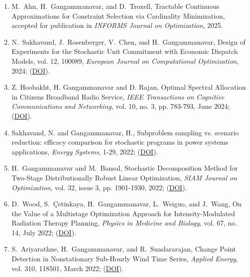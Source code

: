 \documentclass[hyperref, margin]{myResume}
\begin{document}
\begin{resume}
\begin{enumerate}[label=J\arabic*., leftmargin=*]

	\item M.\ Ahn, H.\ Gangammanavar, and D.\ Troxell\footnotemark[2], Tractable Continuous Approximations for Constraint Selection via Cardinality Minimization, accepted for publication in \textit{INFORMS Journal on Optimization}, 2025.

	\item N.\ Sakhavand\footnotemark[3], J.\ Rosenberger, V.\ Chen, and H.\ Gangammanavar, Design of Experiments for the Stochastic Unit Commitment with Economic Dispatch Models, vol. 12, 100089, \textit{European Journal on Computational Optimization}, 2024; (\href{https://doi.org/10.1016/j.ejco.2024.100089}{DOI}). 

	\item Z. Hoobakht\footnotemark[3], H. Gangammanavar and D. Rajan, Optimal Spectral Allocation in Citizens Broadband Radio Service,  \textit{IEEE Transactions on Cognitive Communications and Networking}, vol. 10, no. 3, pp. 783-793, June 2024; (\href{https://doi.org/10.1109/TCCN.2024.3384491}{DOI}).
	
	\item Sakhavand, N. and Gangammanavar, H., Subproblem sampling vs. scenario reduction: efficacy comparison for stochastic programs in power systems applications, \textit{Energy Systems}, 1-29, 2022; (\href{https://doi.org/10.1007/s12667-022-00558-9}{DOI}).

	\item H.\ Gangammanavar and M.\ Bansal, Stochastic Decomposition Method for Two-Stage Distributionally Robust Linear Optimization, \textit{SIAM Journal on Optimization}, vol. 32, issue 3, pp. 1901-1930, 2022; (\href{https://doi.org/10.1137/20M1378600}{DOI}).
	
	\item D.\ Wood\footnotemark[3], S.\ \c{C}etinkaya, H.\ Gangammanavar, L.\ Weiguo, and J.\ Wang, On the Value of a Multistage Optimization Approach for Intensity-Modulated Radiation Therapy Planning, \textit{Physics in Medicine and Biology}, vol. 67, no. 14, July 2022; (\href{https://doi.org/10.1088/1361-6560/ac7a8a}{DOI}).

	\item S.\ Ariyarathne\footnotemark[1], H.\ Gangammanavar, and R.\ Sundararajan, Change Point Detection in Nonstationary Sub-Hourly Wind Time Series, \textit{Applied Energy}, vol. 310, 118501, March 2022; (\href{https://doi.org/10.1016/j.apenergy.2021.118501}{DOI}).
	

\end{enumerate}
\end{resume}
\end{document}
